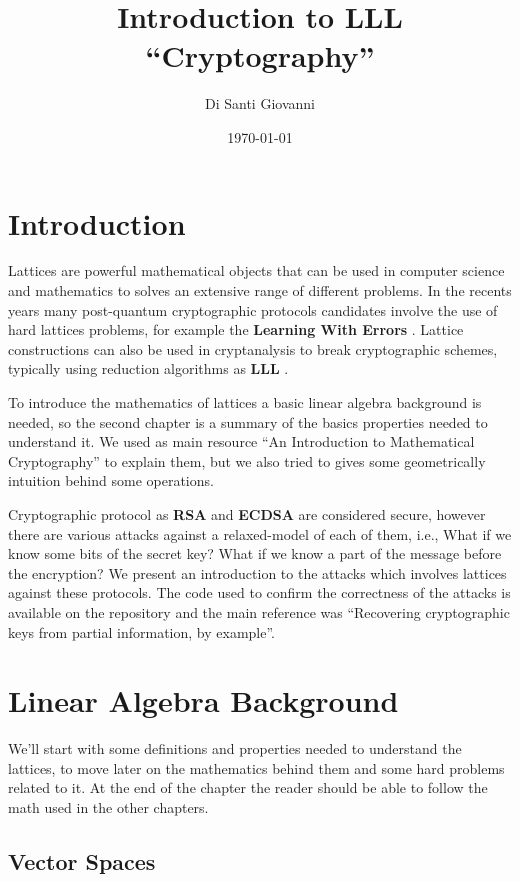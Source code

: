 \documentclass[a4paper,12pt]{report}
\title{Introduction to LLL\\``Cryptography''}
\author{Di Santi Giovanni}
\date{\today}
\begin{document}
 
\maketitle

\tableofcontents

\chapter{Introduction}

Lattices are powerful mathematical objects that can be used in computer science and mathematics to solves an extensive range of different problems.
In the recents years many post-quantum cryptographic protocols candidates involve the use of hard lattices problems,
for example the \textbf{Learning With Errors} \cite{LWE}.
Lattice constructions can also be used in cryptanalysis to break cryptographic schemes, typically using reduction
algorithms as \textbf{LLL} \cite{LLL}.

To introduce the mathematics of lattices a basic linear algebra background is needed, so the second chapter is a summary of the
basics properties needed to understand it. We used as main resource ``An Introduction to Mathematical Cryptography''\cite{mathcrypto14} to
explain them, but we also tried to gives some geometrically intuition behind some operations.

Cryptographic protocol as \textbf{RSA} and \textbf{ECDSA} are considered secure, however there are various attacks against a
relaxed-model of each of them, i.e., What if we know some bits of the secret key? What if we know a part of the message before the encryption?
We present an introduction to the attacks which involves lattices against these protocols. The code used to confirm the correctness
of the attacks is available on the repository \cite{repo} and the main reference was
``Recovering cryptographic keys from partial information, by example''\cite{cryptoeprint:2020:1506}.

\chapter{Linear Algebra Background}

We'll start with some definitions and properties needed to understand the lattices, to move later on the mathematics behind them and some
hard problems related to it. At the end of the chapter the reader should be able to follow the math used in the other chapters.

\section{Vector Spaces}
\end{document}
